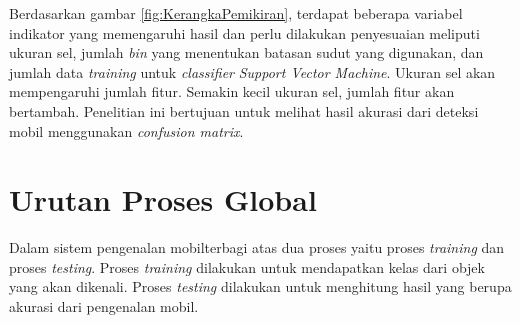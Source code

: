 Berdasarkan gambar \ref{fig:KerangkaPemikiran}, terdapat beberapa variabel indikator yang memengaruhi hasil dan perlu dilakukan penyesuaian meliputi ukuran sel, jumlah \textit{bin} yang menentukan batasan sudut yang digunakan, dan jumlah data \textit{training} untuk \textit{classifier} \textit{Support Vector Machine}. Ukuran sel akan mempengaruhi jumlah fitur. Semakin kecil ukuran sel, jumlah fitur akan bertambah. Penelitian ini bertujuan untuk melihat hasil akurasi dari deteksi mobil menggunakan \textit{confusion matrix}.\\

\section{Urutan Proses Global}
Dalam sistem pengenalan mobilterbagi atas dua proses yaitu proses \textit{training} dan proses \textit{testing}. Proses \textit{training} dilakukan untuk mendapatkan kelas dari objek yang akan dikenali. Proses \textit{testing} dilakukan untuk menghitung hasil yang berupa akurasi dari pengenalan mobil.

\begin{adjustbox}{width=1\textwidth}
	\begin{minipage}{\linewidth}
		\label{fig:FlowchartGlobal}
	\end{minipage}
\end{adjustbox}

